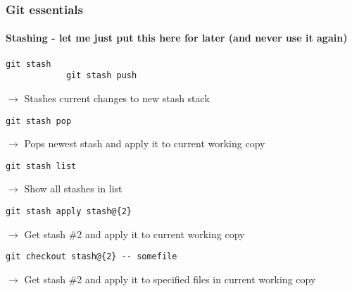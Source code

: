 \documentclass{beamer}
\begin{document}
    \begin{frame}[fragile]
        \frametitle{Git essentials}
        \framesubtitle{Stashing - let me just put this here for later (and never use it again)}
        \begin{lstlisting}[gobble=12]
            git stash
            git stash push
        \end{lstlisting}
        $\rightarrow$ Stashes current changes to new stash stack
        \begin{lstlisting}[gobble=12]
            git stash pop
        \end{lstlisting}
        $\rightarrow$ Pops newest stash and apply it to current working copy
        \begin{lstlisting}[gobble=12]
            git stash list
        \end{lstlisting}
        $\rightarrow$ Show all stashes in list
        \begin{lstlisting}[gobble=12]
            git stash apply stash@{2}
        \end{lstlisting}
        $\rightarrow$ Get stash \#2 and apply it to current working copy
        \begin{lstlisting}[gobble=12]
            git checkout stash@{2} -- somefile
        \end{lstlisting}
        $\rightarrow$ Get stash \#2 and apply it to specified files in current working copy
    \end{frame}
\end{document}
